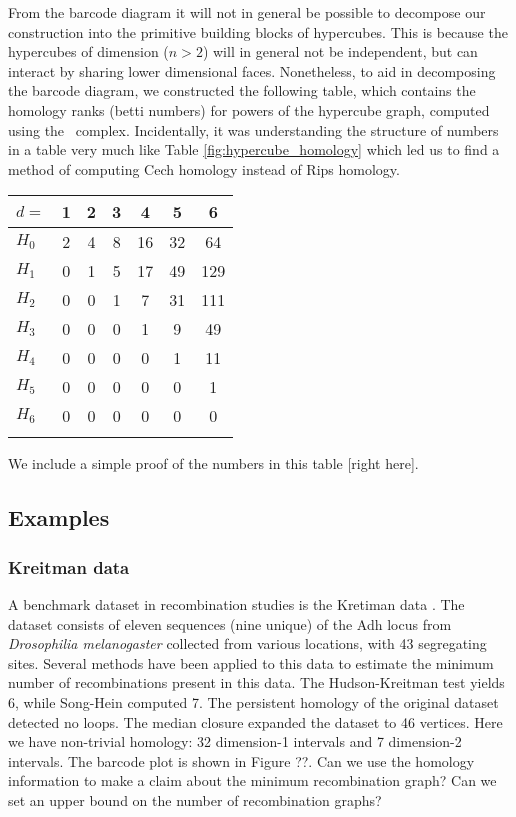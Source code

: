 From the barcode diagram it will not in general be possible to decompose our construction into the primitive building blocks of hypercubes.
This is because the hypercubes of dimension ($n>2$) will in general not be independent, but can interact by sharing lower dimensional faces.
Nonetheless, to aid in decomposing the barcode diagram, we constructed the following table, which contains the homology ranks (betti numbers) for powers of the hypercube graph, computed using the \Cech\ complex.
Incidentally, it was understanding the structure of numbers in a table very much like Table \ref{fig:hypercube_homology} which led us to find a method of computing Cech homology instead of Rips homology.

\begin{center}
\begin{tabular}{lcccccc}
$d=$    & 1 & 2 & 3 &  4 &  5 & 6\\
\toprule
$H_{0}$ & 2 & 4 & 8 & 16 & 32 & 64\\
\midrule
$H_{1}$ & 0 & 1 & 5 & 17 & 49 & 129\\
\midrule
$H_{2}$ & 0 & 0 & 1 &  7 & 31 & 111\\
\midrule
$H_{3}$ & 0 & 0 & 0 &  1 &  9 & 49\\
\midrule
$H_{4}$ & 0 & 0 & 0 & 0 &  1 & 11\\
\midrule
$H_{5}$ & 0 & 0 & 0 & 0 &  0 &  1\\
\midrule
$H_{6}$ & 0 & 0 & 0 & 0 & 0 &  0\\
\bottomrule
\label{fig:hypercube_homology}
\end{tabular}
\end{center}

We include a simple proof of the numbers in this table [right here].

\subsection{Examples}

\subsubsection{Kreitman data}

A benchmark dataset in recombination studies is the Kretiman data \citep{Kreitman:1983}.
The dataset consists of eleven sequences (nine unique) of the Adh locus from \emph{Drosophilia melanogaster} collected from various locations, with 43 segregating sites.
Several methods have been applied to this data to estimate the minimum number of recombinations present in this data.
The Hudson-Kreitman test yields 6, while Song-Hein computed 7.
The persistent homology of the original dataset detected no loops.
The median closure expanded the dataset to 46 vertices.
Here we have non-trivial homology: 32 dimension-1 intervals and 7 dimension-2 intervals.
The barcode plot is shown in Figure ??.
Can we use the homology information to make a claim about the minimum recombination graph?
Can we set an upper bound on the number of recombination graphs?

